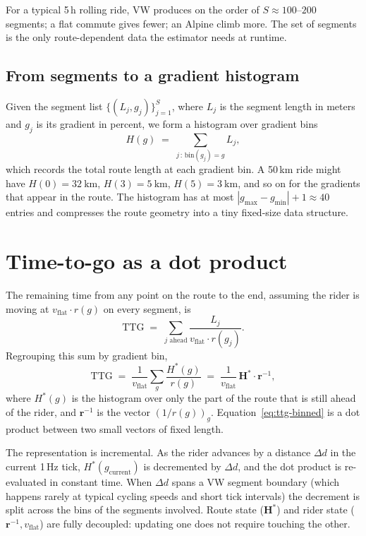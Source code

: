 \documentclass[11pt,a4paper]{article}
\begin{document}
For a typical 5\,\si{\hour} rolling ride, VW produces on the order of
$S \approx 100$--$200$ segments; a flat commute gives fewer; an Alpine
climb more. The set of segments is the only route-dependent data the
estimator needs at runtime.

\subsection{From segments to a gradient histogram}

Given the segment list $\{(L_j, g_j)\}_{j=1}^{S}$, where $L_j$ is the
segment length in meters and $g_j$ is its gradient in percent,
we form a histogram over gradient bins
\begin{equation}
\label{eq:hist}
H(g) \;=\; \sum_{j\,:\,\text{bin}(g_j) = g} L_j,
\end{equation}
which records the total route length at each gradient bin. A 50\,\si{\km}
ride might have $H(0) = \SI{32}{\km}$, $H(3) = \SI{5}{\km}$,
$H(5) = \SI{3}{\km}$, and so on for the gradients that appear in the
route. The histogram has at most $|g_{\max} - g_{\min}| + 1 \approx 40$
entries and compresses the route geometry into a tiny fixed-size
data structure.

\section{Time-to-go as a dot product}
\label{sec:dotproduct}

The remaining time from any point on the route to the end, assuming
the rider is moving at $v_{\text{flat}} \cdot r(g)$ on every segment,
is
\begin{equation}
\label{eq:ttg}
\text{TTG} \;=\; \sum_{j \text{ ahead}} \frac{L_j}{v_{\text{flat}} \cdot r(g_j)}.
\end{equation}
Regrouping this sum by gradient bin,
\begin{equation}
\label{eq:ttg-binned}
\text{TTG} \;=\; \frac{1}{v_{\text{flat}}} \sum_{g} \frac{H^{\ast}(g)}{r(g)}
\;=\; \frac{1}{v_{\text{flat}}} \,\mathbf{H}^{\ast} \cdot \mathbf{r}^{-1},
\end{equation}
where $H^{\ast}(g)$ is the histogram over only the part of the route
that is still ahead of the rider, and $\mathbf{r}^{-1}$ is the
vector $(1/r(g))_g$. Equation~\eqref{eq:ttg-binned} is a dot product
between two small vectors of fixed length.

The representation is incremental. As the rider advances by a
distance $\Delta d$ in the current 1\,\si{\hertz} tick,
$H^{\ast}(g_{\text{current}})$ is decremented by $\Delta d$, and the
dot product is re-evaluated in constant time. When $\Delta d$ spans a
VW segment boundary (which happens rarely at typical cycling speeds
and short tick intervals) the decrement is split across the bins of
the segments involved. Route state ($\mathbf{H}^{\ast}$) and rider
state ($\mathbf{r}^{-1}, v_{\text{flat}}$) are fully decoupled:
updating one does not require touching the other.
\end{document}

